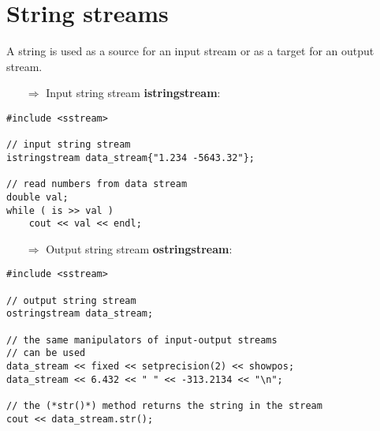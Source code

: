 \documentclass[10pt]{article}
\begin{document}
\section{String streams}
\small
A string is used as a source for an input stream or as a target for an output stream. \\
\begin{enumerate}
\item[$\Rightarrow$] Input string stream \textbf{istringstream}:
\end{enumerate}
\begin{lstlisting}
#include <sstream>

// input string stream
istringstream data_stream{"1.234 -5643.32"};

// read numbers from data stream
double val;
while ( is >> val )
    cout << val << endl;

\end{lstlisting}
\begin{enumerate}
\item[$\Rightarrow$] Output string stream \textbf{ostringstream}:
\end{enumerate}
\begin{lstlisting}
#include <sstream>

// output string stream
ostringstream data_stream;

// the same manipulators of input-output streams
// can be used
data_stream << fixed << setprecision(2) << showpos;
data_stream << 6.432 << " " << -313.2134 << "\n";

// the (*str()*) method returns the string in the stream
cout << data_stream.str();
\end{lstlisting}

%
%
\end{document}
